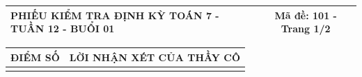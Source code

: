 \documentclass[12pt,a4paper]{article}
\begin{document}
\pagestyle{empty}
\noindent
\begin{tabularx}{\linewidth}{|X|c|}
\hline
\textbf{PHIẾU KIỂM TRA ĐỊNH KỲ TOÁN 7 - TUẦN 12 - BUỔI 01} & \textbf{Mã đề: 101 - Trang 1/2} \\
\hline
\end{tabularx}

\vspace{1.0mm}

\noindent
\begin{tabularx}{\linewidth}{|p{3.2cm}|X|}
\hline
\centering\textbf{ĐIỂM SỐ} & \centering\textbf{LỜI NHẬN XÉT CỦA THẦY CÔ} \tabularnewline
\hline
\rule{0pt}{1.8cm} & \tabularnewline
\hline
\end{tabularx}
\end{document}
